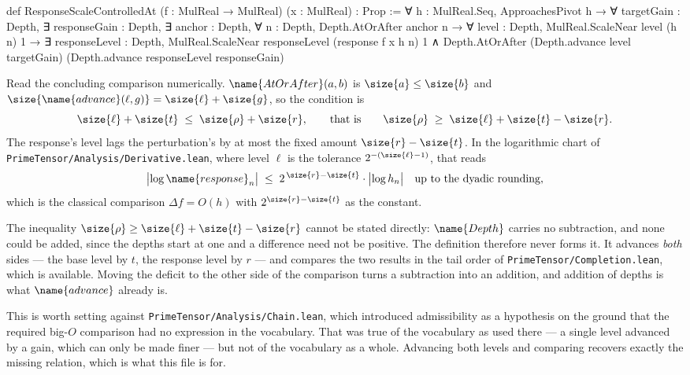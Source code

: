 \begin{leancode}
def ResponseScaleControlledAt
    (f : MulReal → MulReal) (x : MulReal) : Prop :=
  ∀ h : MulReal.Seq,
    ApproachesPivot h →
    ∀ targetGain : Depth,
      ∃ responseGain : Depth,
      ∃ anchor : Depth,
        ∀ n : Depth,
          Depth.AtOrAfter anchor n →
          ∀ level : Depth,
            MulReal.ScaleNear level (h n) 1 →
            ∃ responseLevel : Depth,
              MulReal.ScaleNear responseLevel
                (response f x h n) 1 ∧
              Depth.AtOrAfter
                (Depth.advance level targetGain)
                (Depth.advance responseLevel responseGain)
\end{leancode}

\begin{designnote}
\label{Analysis:Growth:note:big-o}
Read the concluding comparison numerically.  $\name{AtOrAfter}(a,b)$ is
$\size{a} \leq \size{b}$ and $\size{\name{advance}(\ell,g)} = \size{\ell} +
\size{g}$, so the condition is
\[
  \size{\ell} + \size{t} \;\leq\; \size{\rho} + \size{r},
  \qquad\text{that is}\qquad
  \size{\rho} \;\geq\; \size{\ell} + \size{t} - \size{r}.
\]
The response's level lags the perturbation's by at most the fixed amount
$\size{r} - \size{t}$.  In the logarithmic chart of
\texttt{PrimeTensor/Analysis/Derivative.lean}, where level $\ell$ is the
tolerance $2^{-(\size{\ell}-1)}$, that reads
\[
  \bigl\lvert \log \name{response}_n \bigr\rvert
    \;\leq\; 2^{\,\size{r}-\size{t}} \cdot
      \bigl\lvert \log h_n \bigr\rvert
    \quad\text{up to the dyadic rounding},
\]
which is the classical comparison $\Delta f = O(h)$ with
$2^{\size{r}-\size{t}}$ as the constant.

The inequality $\size{\rho} \geq \size{\ell} + \size{t} - \size{r}$ cannot be
stated directly: $\name{Depth}$ carries no subtraction, and none could be
added, since the depths start at one and a difference need not be positive.
The definition therefore never forms it.  It advances \emph{both} sides ---
the base level by $t$, the response level by $r$ --- and compares the two
results in the tail order of \texttt{PrimeTensor/Completion.lean}, which is
available.  Moving the deficit to the other side of the comparison turns a
subtraction into an addition, and addition of depths is what $\name{advance}$
already is.

This is worth setting against
\texttt{PrimeTensor/Analysis/Chain.lean}, which introduced admissibility as a
hypothesis on the ground that the required big-$O$ comparison had no expression
in the vocabulary.  That was true of the vocabulary as used there --- a single
level advanced by a gain, which can only be made finer --- but not of the
vocabulary as a whole.  Advancing both levels and comparing recovers exactly
the missing relation, which is what this file is for.
\end{designnote}

